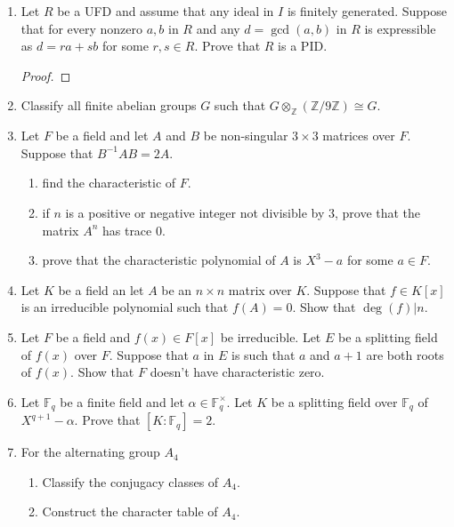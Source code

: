 \documentclass[11pt,letterpaper]{report}
\newcommand{\integers}{\mathbb{Z}}
\newcommand{\field}{\mathbb{F}}
\begin{document}
\begin{enumerate}
\begin{proof}
		Since the image of $\integers$ in $k$ is finite, we have that $k$ has positive characteristic, say $p$. In particular, we have that $(p)\subset \mathfrak{m}$. Since $\integers[x]$ is Noetherian, we can write
		\[
		\mathfrak{m} = (p, f_1(x), \ldots, f_k(x))
		\]
		for some finite $k$, which gives
		\[
		\integers[x]/\mathfrak{m}\cong (\integers/p\integers)[x]/(f_1(x), \ldots, f_k(x)),
		\]
		which is a finite field.
	\end{proof}

	\item Let $R$ be a UFD and assume that any ideal in $I$ is finitely generated. Suppose that for every nonzero $a,b$ in $R$ and any $d = \gcd(a,b)$ in $R$ is expressible as $d = ra+sb$ for some $r,s\in R$. Prove that $R$ is a PID.
	\begin{proof}
		
	\end{proof}
	
	\item Classify all finite abelian groups $G$ such that $G\otimes_\integers (\integers/9\integers)\cong G$.
	\item Let $F$ be a field and let $A$ and $B$ be non-singular $3\times 3$ matrices over $F$. Suppose that $B^{-1}AB = 2A$.
	\begin{enumerate}
		\item find the characteristic of $F$.
		\item if $n$ is a positive or negative integer not divisible by 3, prove that the matrix $A^n$ has trace 0.
		\item prove that the characteristic polynomial of $A$ is $X^3-a$ for some $a\in F$.
	\end{enumerate}
	\item Let $K$ be a field an let $A$ be an $n\times n$ matrix over $K$. Suppose that $f\in K[x]$ is an irreducible polynomial such that $f(A) = 0$. Show that $\deg(f)|n$.
	\item Let $F$ be a field and $f(x)\in F[x]$ be irreducible. Let $E$ be a splitting field of $f(x)$ over $F$. Suppose that $a$ in $E$ is such that $a$ and $a+1$ are both roots of $f(x)$. Show that $F$ doesn't have characteristic zero.
	\item Let $\field_q$ be a finite field and let $\alpha\in \field_q^\times$. Let $K$ be a splitting field over $\field_q$ of $X^{q+1}-\alpha$. Prove that $[K: \field_q] = 2$.
	\item For the alternating group $A_4$
	\begin{enumerate}
		\item Classify the conjugacy classes of $A_4$.
		\item Construct the character table of $A_4$.
	\end{enumerate}
\end{enumerate}
\end{document}
